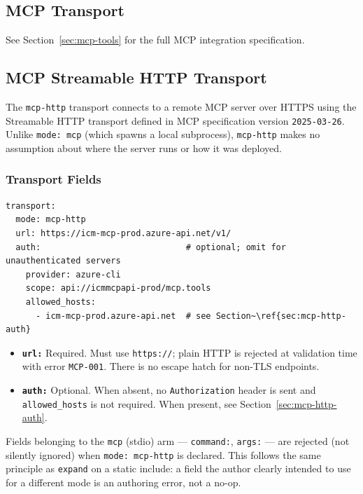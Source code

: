 \subsection{MCP Transport}

See Section~\ref{sec:mcp-tools} for the full MCP integration specification.

\subsection{MCP Streamable HTTP Transport}
\label{sec:mcp-http}

The \texttt{mcp-http} transport connects to a remote MCP server over HTTPS
using the Streamable HTTP transport defined in MCP specification version
\texttt{2025-03-26}.  Unlike \texttt{mode: mcp} (which spawns a local
subprocess), \texttt{mcp-http} makes no assumption about where the server
runs or how it was deployed.

\subsubsection{Transport Fields}

\begin{verbatim}
transport:
  mode: mcp-http
  url: https://icm-mcp-prod.azure-api.net/v1/
  auth:                             # optional; omit for unauthenticated servers
    provider: azure-cli
    scope: api://icmmcpapi-prod/mcp.tools
    allowed_hosts:
      - icm-mcp-prod.azure-api.net  # see Section~\ref{sec:mcp-http-auth}
\end{verbatim}

\begin{itemize}
  \item \textbf{\texttt{url:}} Required.  Must use \texttt{https://}; plain
        HTTP is rejected at validation time with error \texttt{MCP-001}.
        There is no escape hatch for non-TLS endpoints.
  \item \textbf{\texttt{auth:}} Optional.  When absent, no \texttt{Authorization}
        header is sent and \texttt{allowed\_hosts} is not required.  When
        present, see Section~\ref{sec:mcp-http-auth}.
\end{itemize}

Fields belonging to the \texttt{mcp} (stdio) arm --- \texttt{command:},
\texttt{args:} --- are rejected (not silently ignored) when
\texttt{mode: mcp-http} is declared.  This follows the same principle as
\texttt{expand} on a static include: a field the author clearly intended to
use for a different mode is an authoring error, not a no-op.

